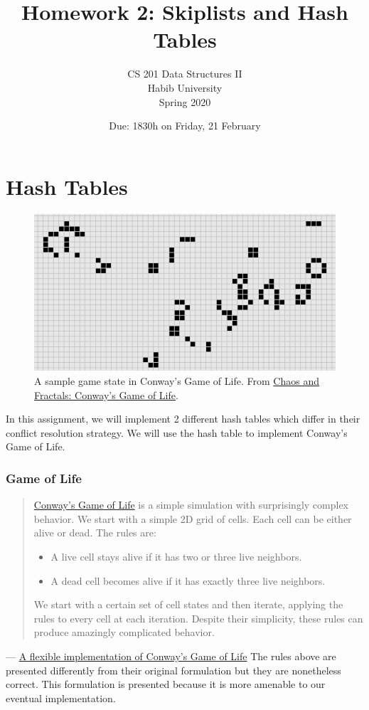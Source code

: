 \documentclass[addpoints]{exam}
\title{Homework 2: Skiplists and Hash Tables}
\author{CS 201 Data Structures II\\Habib University\\Spring 2020}
\date{Due: 1830h on Friday, 21 February}  %
\begin{document}
\maketitle

\part{Hash Tables}

\begin{figure}[!h]
  \centering
  \includegraphics[scale=.8]{banner}
  \caption{A sample game state in Conway's Game of Life. From \href{http://pi.math.cornell.edu/~lipa/mec/lesson6.html}{Chaos and Fractals: Conway's Game of Life}.}
\end{figure}

In this assignment, we will implement 2 different hash tables which differ in their conflict resolution strategy. We will use the hash table to implement Conway's Game of Life.

\section{Game of Life}
\label{sec:imgops}

\begin{quotation}
\href{https://en.wikipedia.org/wiki/Conway's_Game_of_Life}{Conway’s Game of Life} is a simple simulation with surprisingly complex behavior. We start with a simple 2D grid of cells. Each cell can be either alive or dead. The rules are:
\begin{itemize}
\item A live cell stays alive if it has two or three live neighbors.
\item A dead cell becomes alive if it has exactly three live neighbors.
\end{itemize}
We start with a certain set of cell states and then iterate, applying the rules to every cell at each iteration. Despite their simplicity, these rules can produce amazingly complicated behavior.
\end{quotation}
\raggedleft --- \href{https://www.refsmmat.com/posts/2016-01-25-conway-game-of-life.html}{A flexible implementation of Conway's Game of Life}
\justify
The rules above are presented differently from their original formulation but they are nonetheless correct. This formulation is presented because it is more amenable to our eventual implementation.
\end{document}
